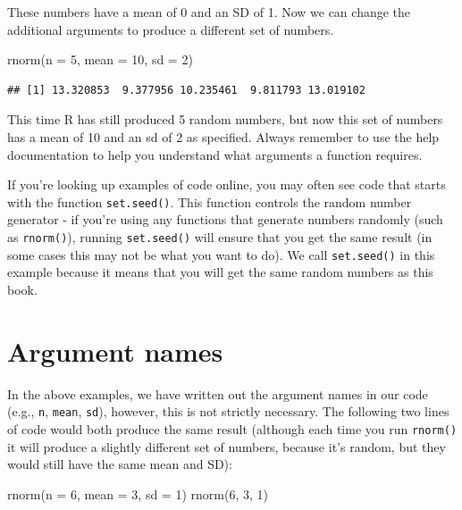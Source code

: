\documentclass[
  oneside]{book}
\newenvironment{Shaded}{\begin{snugshade}}{\end{snugshade}}
\newcommand{\AttributeTok}[1]{\textcolor[rgb]{0.77,0.63,0.00}{#1}}
\newcommand{\DecValTok}[1]{\textcolor[rgb]{0.00,0.00,0.81}{#1}}
\newcommand{\FunctionTok}[1]{\textcolor[rgb]{0.00,0.00,0.00}{#1}}
\newcommand{\NormalTok}[1]{#1}
\begin{document}
These numbers have a mean of 0 and an SD of 1. Now we can change the additional arguments to produce a different set of numbers.

\begin{Shaded}
\begin{Highlighting}[]
\FunctionTok{rnorm}\NormalTok{(}\AttributeTok{n =} \DecValTok{5}\NormalTok{, }\AttributeTok{mean =} \DecValTok{10}\NormalTok{, }\AttributeTok{sd =} \DecValTok{2}\NormalTok{)}
\end{Highlighting}
\end{Shaded}

\begin{verbatim}
## [1] 13.320853  9.377956 10.235461  9.811793 13.019102
\end{verbatim}

This time R has still produced 5 random numbers, but now this set of numbers has a mean of 10 and an sd of 2 as specified. Always remember to use the help documentation to help you understand what arguments a function requires.

\begin{info}
If you're looking up examples of code online, you may often see code
that starts with the function \texttt{set.seed()}. This function
controls the random number generator - if you're using any functions
that generate numbers randomly (such as \texttt{rnorm()}), running
\texttt{set.seed()} will ensure that you get the same result (in some
cases this may not be what you want to do). We call \texttt{set.seed()}
in this example because it means that you will get the same random
numbers as this book.
\end{info}

\hypertarget{argument-names}{%
\section{Argument names}\label{argument-names}}

In the above examples, we have written out the argument names in our code (e.g., \texttt{n}, \texttt{mean}, \texttt{sd}), however, this is not strictly necessary. The following two lines of code would both produce the same result (although each time you run \texttt{rnorm()} it will produce a slightly different set of numbers, because it's random, but they would still have the same mean and SD):

\begin{Shaded}
\begin{Highlighting}[]
\FunctionTok{rnorm}\NormalTok{(}\AttributeTok{n =} \DecValTok{6}\NormalTok{, }\AttributeTok{mean =} \DecValTok{3}\NormalTok{, }\AttributeTok{sd =} \DecValTok{1}\NormalTok{)}
\FunctionTok{rnorm}\NormalTok{(}\DecValTok{6}\NormalTok{, }\DecValTok{3}\NormalTok{, }\DecValTok{1}\NormalTok{)}
\end{Highlighting}
\end{Shaded}
\end{document}
